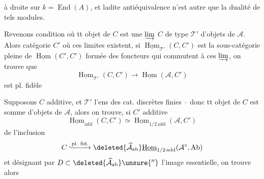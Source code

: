 à droite sur $k=\operatorname{End}(A)$, et ladite
antiéquivalence n'est autre que la
dualité de tels modules.

Revenons  condition où
tt objet de $C$ est une $\varinjlim$  $C$
de type $\mathcal T'$ d'objets de $\mathcal A$. Alors
 catégorie $C'$ où ces limites existent,
si $\underline{\operatorname{Hom}}_{\mathcal T'}(C,C')$ est la sous-catégorie
pleine de $\underline{\operatorname{Hom}}(C',C')$ formée des
foncteurs qui commutent à ces
$\varinjlim$, on trouve que
\[
 \underline{\operatorname{Hom}}_{\mathcal T'}(C,C')\longrightarrow\underline{\operatorname{Hom}}(\mathcal A,C')
\]
est pl. fidèle 

Supposons $C$ additive, et $\mathcal T'$ l'ens
des cat. discrètes finies -- donc
tt objet de $C$ est somme d'objets
de $\mathcal A$, alors on trouve, si $C'$ additive
\[
 \underline{\operatorname{Hom}}_{\mathrm{add}}(C,C')\simeq
 \underline{\operatorname{Hom}}_{1/2\,\mathrm{add}}(\mathcal A,C')
\]
 de l'inclusion
\[
 C\lhook\joinrel\xrightarrow{\mathrm{pl.\ fid.}}
 \deleted{\widehat{\mathcal A}_{\mathrm{ab}}}
 \underline{\operatorname{Hom}}_{1/2\,\mathrm{add}}(\mathcal A^\circ,\mathrm{Ab})
\]
et désignant par $D\subset\deleted{\widehat{\mathcal A}_{\mathrm{ab}}}\unsure{''}$ l'image
essentielle, on trouve alors
